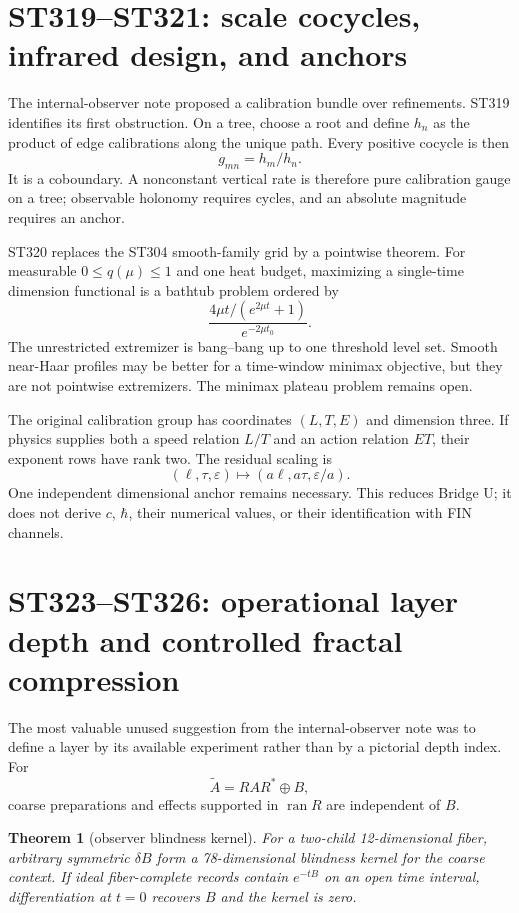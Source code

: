 \documentclass[11pt,a4paper]{article}
\newtheorem{theorem}{Theorem}[section]
\begin{document}
\section{ST319--ST321: scale cocycles, infrared design, and anchors}

The internal-observer note proposed a calibration bundle over refinements. ST319 identifies
its first obstruction. On a tree, choose a root and define $h_n$ as the product of edge
calibrations along the unique path. Every positive cocycle is then
\[
g_{mn}=h_m/h_n.
\]
It is a coboundary. A nonconstant vertical rate is therefore pure calibration gauge on a
tree; observable holonomy requires cycles, and an absolute magnitude requires an anchor.

ST320 replaces the ST304 smooth-family grid by a pointwise theorem. For measurable
$0\le q(\mu)\le1$ and one heat budget, maximizing a single-time dimension functional is a
bathtub problem ordered by
\[
\frac{4\mu t/(e^{2\mu t}+1)}{e^{-2\mu t_0}}.
\]
The unrestricted extremizer is bang--bang up to one threshold level set. Smooth near-Haar
profiles may be better for a time-window minimax objective, but they are not pointwise
extremizers. The minimax plateau problem remains open.

The original calibration group has coordinates $(L,T,E)$ and dimension three. If physics
supplies both a speed relation $L/T$ and an action relation $ET$, their exponent rows have
rank two. The residual scaling is
\[
(\ell,\tau,\varepsilon)\mapsto(a\ell,a\tau,\varepsilon/a).
\]
One independent dimensional anchor remains necessary. This reduces Bridge U; it does not
derive $c$, $\hbar$, their numerical values, or their identification with FIN channels.

\section{ST323--ST326: operational layer depth and controlled fractal compression}

The most valuable unused suggestion from the internal-observer note was to define a layer
by its available experiment rather than by a pictorial depth index. For
\[
\widetilde A=RAR^*\oplus B,
\]
coarse preparations and effects supported in $\operatorname{ran}R$ are independent of $B$.

\begin{theorem}[observer blindness kernel]
For a two-child 12-dimensional fiber, arbitrary symmetric $\delta B$ form a
78-dimensional blindness kernel for the coarse context. If ideal fiber-complete records
contain $e^{-tB}$ on an open time interval, differentiation at $t=0$ recovers $B$ and the
kernel is zero.
\end{theorem}
\end{document}
